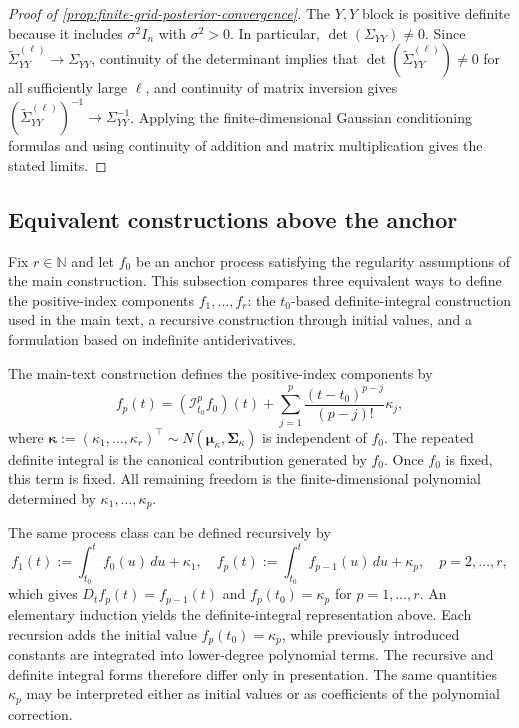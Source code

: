 \documentclass[11pt,a4paper]{article}
\theoremstyle{definition}
\theoremstyle{remark}
\begin{document}
\begin{proof}[Proof of \cref{prop:finite-grid-posterior-convergence}]
The \(Y,Y\) block is positive definite because it includes \(\sigma^2 I_n\) with \(\sigma^2>0\). In particular, \(\det(\Sigma_{YY})\neq0\). Since \(\widetilde\Sigma_{YY}^{(\ell)}\to\Sigma_{YY}\), continuity of the determinant implies that \(\det(\widetilde\Sigma_{YY}^{(\ell)})\neq0\) for all sufficiently large \(\ell\), and continuity of matrix inversion gives \((\widetilde\Sigma_{YY}^{(\ell)})^{-1}\to\Sigma_{YY}^{-1}\). Applying the finite-dimensional Gaussian conditioning formulas and using continuity of addition and matrix multiplication gives the stated limits.
\end{proof}


\subsection{Equivalent constructions above the anchor}\label{appendix:alternative-positive-constructions}
Fix \(r \in \mathbb{N}\) and let \(f_0\) be an anchor process satisfying the regularity assumptions of the main construction. This subsection compares three equivalent ways to define the positive-index components \(f_1,\ldots,f_r\): the \(t_0\)-based definite-integral construction used in the main text, a recursive construction through initial
  values, and a formulation based on indefinite antiderivatives.

The main-text construction defines the positive-index components by
\[
f_p(t)= (\mathcal I_{t_0}^p f_0)(t)+\sum_{j=1}^p \frac{(t-t_0)^{p-j}}{(p-j)!}\kappa_j,
\]
where $\boldsymbol{\kappa}:=(\kappa_1,\ldots,\kappa_r)^\top \sim N(\boldsymbol{\mu}_\kappa,\boldsymbol{\Sigma}_\kappa)$ is independent of $f_0$. The repeated definite integral is the canonical contribution generated by \(f_0\). Once \(f_0\) is fixed, this term is fixed. All remaining freedom is the finite-dimensional polynomial determined by \(\kappa_1,\ldots,\kappa_p\).

The same process class can be defined recursively by
\[
f_1(t):=\int_{t_0}^t f_0(u)\,du+\kappa_1,\quad
f_p(t):=\int_{t_0}^t f_{p-1}(u)\,du+\kappa_p,\quad p=2,\ldots,r,
\]
which gives \(D_t f_p(t)=f_{p-1}(t)\) and \(f_p(t_0)=\kappa_p\) for \(p=1,\ldots,r\). An elementary induction yields the definite-integral representation above. Each recursion adds the initial value \(f_p(t_0)=\kappa_p\), while previously introduced constants are integrated into lower-degree polynomial terms. The recursive and definite integral forms therefore differ only in presentation. The same quantities \(\kappa_p\) may be interpreted either as initial values or as coefficients of the polynomial correction.
\end{document}
